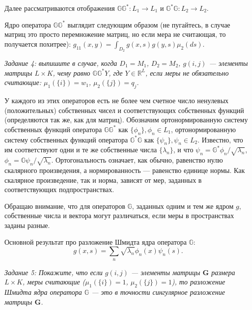 \documentclass[12 pt]{article}
\begin{document}
Далее рассматриваются отображения $\mathbb{G}\mathbb{G}^*: L_1\rightarrow L_1$ и
$\mathbb{G}^*\mathbb{G}: L_2\rightarrow L_2$.

Ядро оператора $\mathbb{G}\mathbb{G}^*$ выглядит следующим образом (не пугайтесь, в случае матриц это просто перемножение матриц,
но если мера не считающая, то получается похитрее):
$g_{11}(x,y) = \int_{D_2} g(x,s) g(y,s) \mu_2(ds)$.

\textit{Задание 4: выпишите в случае, когда $D_1=M_1$, $D_2=M_2$, $g(i,j)$  --- элементы матрицы $L\times K$, чему равно $\mathbb{G}\mathbb{G}^* Y$, где $Y\in \mathbb{R}^L$,
если меры не обязательно считающие: $\mu_1(\{i\})=w_1$, $\mu_2(\{j\})=q_j$.}

У каждого из этих операторов есть не более чем счетное число ненулевых (положительных)
собственных чисел и соответствующих собственных функций (определяются так же, как
для матриц). Обозначим ортонормированную систему собственных функций оператора
$\mathbb{G}\mathbb{G}^*$ как $\{\phi_n\}, \phi_n\in L_1$, ортонормированную систему собственных функций оператора
$\mathbb{G}^*\mathbb{G}$ как $\{\psi_n\}, \psi_n\in L_2$. Известно, что им соответствуют одни и те же собственные числа
$\{\lambda_n\}$, и что $\psi_n = \mathbb{G}^*\phi_n/\sqrt{\lambda_n}$, $\phi_n = \mathbb{G}\psi_n/\sqrt{\lambda_n}$.
Ортогональность означает, как обычно, равенство нулю скалярного произведения,
а нормированность --- равенство единице нормы.  Как скалярное произведение, так и норма, зависят от мер,
заданных в соответствующих подпространствах.

Обращаю внимание, что для операторов $\mathbb{G}$, заданных одним и тем же ядром
$g$, собственные числа и вектора могут различаться, если меры в пространствах заданы разные.

Основной результат про разложение Шмидта ядра оператора $\mathbb{G}$:
$$g(x,s) = \sum_n \sqrt{\lambda_n} \phi_n(x) \psi_n(s).$$

\textit{Задание 5: Покажите, что если $g(i,j)$  --- элементы матрицы  $\mathbf{G}$ размера $L\times K$, меры считающие
($\mu_1(\{i\})=1$, $\mu_2(\{j\})=1$), то разложение Шмидта ядра оператора $\mathbb{G}$ --- это в точности сингулярное разложение матрицы $\mathbf{G}$.}
\end{document}
